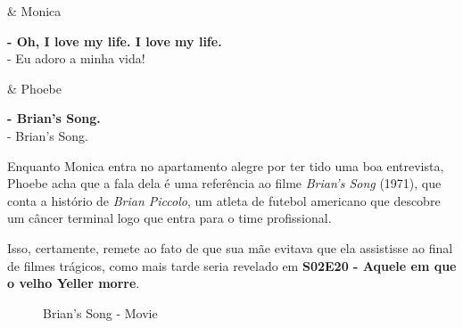 \begin{tcolorbox}[enhanced,center upper,
    drop fuzzy shadow southeast, boxrule=0.3pt,
    lower separated=false, breakable,
    colframe=black!30!dialogoBorder,colback=white]
\begin{minipage}[c]{0.16\linewidth}
   & \centering \scriptsize{Monica}
\end{minipage}
\hfill
\begin{minipage}[c]{0.8\linewidth}
  \textbf{- Oh, I love my life. I love my life.}\\
  - Eu adoro a minha vida!
\end{minipage}

\medskip
\begin{minipage}[c]{0.16\linewidth}
   & \centering \scriptsize{Phoebe}
\end{minipage}
\hfill
\begin{minipage}[c]{0.8\linewidth}
  \textbf{- Brian's Song.}\\
  - Brian's Song.
\end{minipage}
\end{tcolorbox}

Enquanto Monica entra no apartamento alegre por ter tido uma boa
entrevista, Phoebe acha que a fala dela é uma referência ao filme
\emph{Brian's Song} (1971), que conta a histório de \emph{Brian
Piccolo}, um atleta de futebol americano que descobre um câncer terminal
logo que entra para o time profissional.

Isso, certamente, remete ao fato de que sua mãe evitava que ela
assistisse ao final de filmes trágicos, como mais tarde seria revelado
em
\textbf{\textcolor{primarycolor}{S02E20 - Aquele em que o velho Yeller morre}}.

\begin{figure}
  \centering
    \caption{Brian’s Song - Movie\label{fig:brian-s-song-movie}}
\end{figure}

